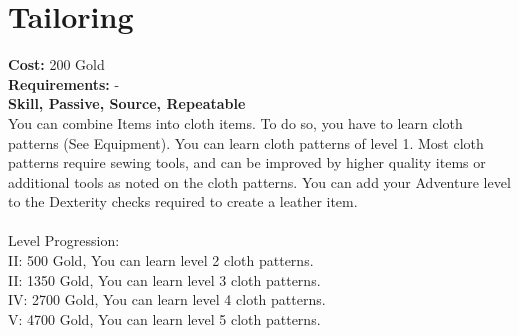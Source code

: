 \section{Tailoring}
\textbf{Cost:} 200 Gold\\
\textbf{Requirements:} -\\
\textbf{Skill, Passive, Source, Repeatable}\\
You can combine Items into cloth items. To do so, you have to learn cloth patterns (See Equipment). You can learn cloth patterns of level 1. Most cloth patterns require sewing tools, and can be improved by higher quality items or additional tools as noted on the cloth patterns. You can add your Adventure level to the Dexterity checks required to create a leather item.\\
\\
Level Progression:\\
II: 500 Gold, You can learn level 2 cloth patterns.\\
II: 1350 Gold, You can learn level 3 cloth patterns.\\
IV: 2700 Gold, You can learn level 4 cloth patterns.\\
V: 4700 Gold, You can learn level 5 cloth patterns.\\